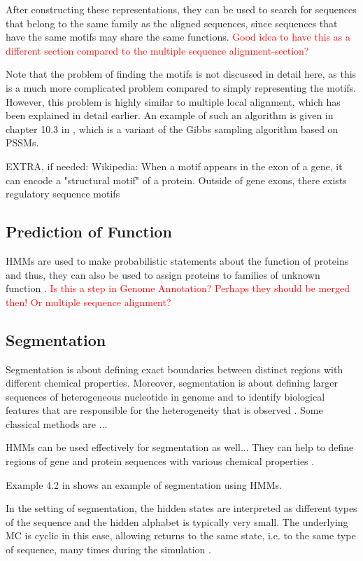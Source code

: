 \documentclass{article}
\begin{document}
After constructing these representations, they can be used to search for sequences that belong to the same family as the aligned sequences, since sequences that have the same motifs may share the same functions. \textcolor{red}{Good idea to have this as a different section compared to the multiple sequence alignment-section?}

Note that the problem of finding the motifs is not discussed in detail here, as this is a much more complicated problem compared to simply representing the motifs. However, this problem is highly similar to multiple local alignment, which has been explained in detail earlier. An example of such an algorithm is given in chapter 10.3 in \cite{Christianini2006}, which is a variant of the Gibbs sampling algorithm based on PSSMs. 

EXTRA, if needed: 
Wikipedia: When a motif appears in the exon of a gene, it can encode a "structural motif" of a protein. Outside of gene exons, there exists regulatory sequence motifs 

\subsection{Prediction of Function}
HMMs are used to make probabilistic statements about the function of proteins and thus, they can also be used to assign proteins to families of unknown function \cite{Christianini2006}. \textcolor{red}{Is this a step in Genome Annotation? Perhaps they should be merged then! Or multiple sequence alignment?}

\subsection{Segmentation}
Segmentation is about defining exact boundaries between distinct regions with different chemical properties. Moreover, segmentation is about defining larger sequences of heterogeneous nucleotide in genome and to identify biological features that are responsible for the heterogeneity that is observed \cite{Christianini2006}. Some classical methods are ...

HMMs can be used effectively for segmentation as well... They can help to define regions of gene and protein sequences with various chemical properties \cite{Christianini2006}. 

Example 4.2 in \cite{Christianini2006} shows an example of segmentation using HMMs.

In the setting of segmentation, the hidden states are interpreted as different types of the sequence and the hidden alphabet is typically very small. The underlying MC is cyclic in this case, allowing returns to the same state, i.e. to the same type of sequence, many times during the simulation \cite{Christianini2006}. 
\end{document}
